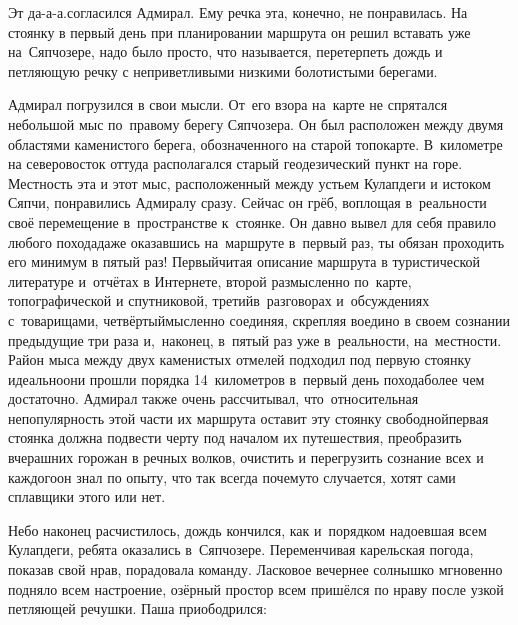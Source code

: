 \diagdash Эт да-а-а.\mdash согласился Адмирал. Ему речка эта, конечно, не понравилась. На стоянку в первый день при планировании маршрута  он решил вставать уже на~Сяпчозере, надо было просто, что называется, перетерпеть дождь и петляющую речку с неприветливыми низкими болотистыми берегами. 

Адмирал погрузился в свои мысли. От~его взора на~карте не спрятался небольшой мыс по~правому берегу Сяпчозера. Он был расположен между двумя областями каменистого берега, обозначенного на старой топокарте. В~километре на северо\sdash восток оттуда располагался старый геодезический пункт на горе. Местность эта и этот мыс, расположенный между устьем Кулапдеги и истоком Сяпчи, понравились Адмиралу сразу. Сейчас он грёб, воплощая в~реальности своё перемещение в~пространстве к~стоянке. Он давно вывел для себя правило любого похода\mdash даже оказавшись на~маршруте в~первый раз, ты обязан проходить его минимум в пятый раз! Первый\mdash читая описание маршрута в туристической литературе и~отчётах в Интернете, второй раз\mdash мысленно по~карте, топографической и спутниковой, третий\mdash в~разговорах и~обсуждениях с~товарищами, четвёртый\mdash мысленно соединяя, скрепляя воедино в своем сознании предыдущие три раза и,~наконец, в~пятый раз уже в~реальности, на~местности. Район мыса между двух каменистых отмелей подходил под первую стоянку идеально\mdash они прошли порядка 14~километров в~первый день похода\mdash более чем достаточно. Адмирал также очень рассчитывал, что~относительная непопулярность этой части их маршрута оставит эту стоянку свободной\mdash первая стоянка должна подвести черту под началом их путешествия, преобразить вчерашних горожан в речных волков, очистить и перегрузить сознание всех и каждого\mdash он знал по опыту, что так всегда почему\sdash то случается, хотят сами сплавщики этого или нет. 

Небо наконец расчистилось, дождь кончился, как и~порядком надоевшая всем Кулапдеги, ребята оказались в~Сяпчозере. Переменчивая карельская погода, показав свой нрав, порадовала команду. Ласковое вечернее солнышко мгновенно подняло всем настроение, озёрный простор всем пришёлся по нраву после узкой петляющей речушки. Паша приободрился:


